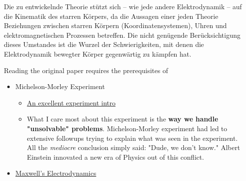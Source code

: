 {Die zu entwickelnde Theorie stützt sich -- wie jede andere Elektrodynamik -- auf die Kinematik des starren Körpers, da
die Aussagen einer jeden Theorie Beziehungen zwischen starren Körpern (Koordinatensystemen), Uhren und
elektromagnetischen Prozessen betreffen. Die nicht genügende Berücksichtigung dieses Umstandes ist die Wurzel der
Schwierigkeiten, mit denen die Elektrodynamik bewegter Körper gegenwärtig zu kämpfen hat.

}

\begin{tcolorbox}[
    colback=green!5!white,
    colframe=green!75!black,
    colbacktitle=red!85!black
]
\end{tcolorbox}

Reading the original paper requires the prerequisites of

\begin{itemize}
    \item Michelson-Morley Experiment

    \begin{itemize}
        \item \href{https://youtu.be/3G_Q6AggQF8}{An excellent experiment intro}
        \item What I care most about this experiment is the \textbf{way we handle "unsolvable"
        problems}. Michelson-Morley experiment had led to extensive followups trying to explain what was seen in the experiment. All the \textit{mediocre} conclusion simply said: "Dude, we don't know." Albert Einstein innovated a new era of Physics out of this conflict. 
    \end{itemize}

    \item \href{https://trello.com/c/SlPIXwCY}{Maxwell's Electrodynamics}


\end{itemize}


